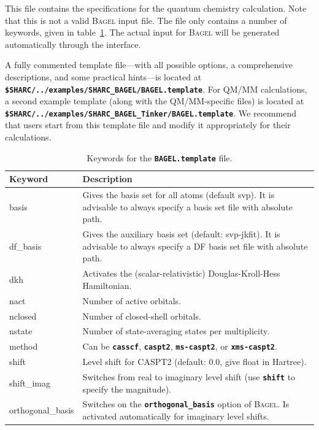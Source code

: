 \documentclass[a4paper,10pt,DIV=15,openany]{scrbook}
\newcommand{\ttt}[1]{\textbf{\texttt{#1}}}
\begin{document}
This file contains the specifications for the quantum chemistry calculation. Note that this is not a valid \textsc{Bagel} input file. The file only contains a number of keywords, given in table~\ref{tab:bagel_temp}. The actual input for \textsc{Bagel} will be generated automatically through the interface.

A fully commented template file---with all possible options, a comprehensive descriptions, and some practical hints---is located at \ttt{\$SHARC/../examples/SHARC\_BAGEL/BAGEL.template}.
For QM/MM calculations, a second example template (along with the QM/MM-specific files) is located at \ttt{\$SHARC/../examples/SHARC\_BAGEL\_Tinker/BAGEL.template}.
We recommend that users start from this template file and modify it appropriately for their calculations.

\begin{table}
  \centering
  \caption{Keywords for the \ttt{BAGEL.template} file.}
  \label{tab:bagel_temp}
  \small
  \begin{tabular}{>{\ttfamily}lp{12cm}}
  \hline
  Keyword       &Description\\
  \hline
basis                   &Gives the basis set for all atoms (default svp). It is advisable to always specify a basis set file with absolute path.
\\
df\_basis               &Gives the auxiliary basis set (default: svp-jkfit). It is advisable to always specify a DF basis set file with absolute path.
\\
dkh                     &Activates the (scalar-relativistic) Douglas-Kroll-Hess Hamiltonian.
\\
nact                    &Number of active orbitals.
\\
nclosed                 &Number of closed-shell orbitals.
\\
nstate                  &Number of state-averaging states per multiplicity.
\\
method                  &Can be \ttt{casscf}, \ttt{caspt2}, \ttt{ms-caspt2}, or \ttt{xms-caspt2}.
\\
shift                   &Level shift for CASPT2 (default: 0.0, give float in Hartree).
\\
shift\_imag             &Switches from real to imaginary level shift (use \ttt{shift} to specify the magnitude).
\\
orthogonal\_basis       &Switches on the \ttt{orthogonal\_basis} option of \textsc{Bagel}. Is activated automatically for imaginary level shifts.
\\

\end{tabular}
\end{table}
\end{document}
